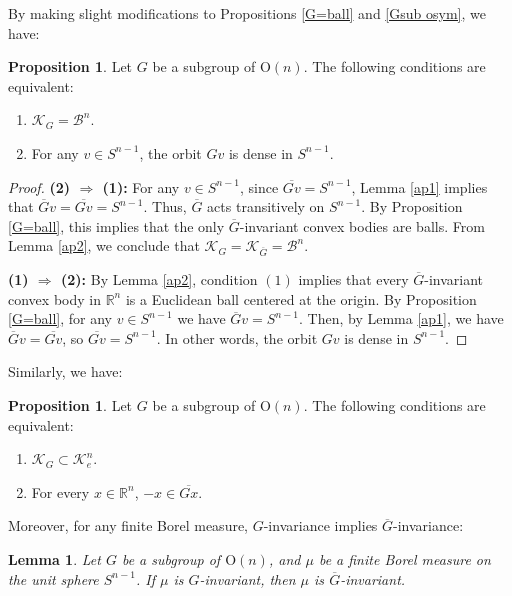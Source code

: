 \documentclass[12pt, reqno]{amsart}
\newtheorem{lemma}[theorem]{Lemma}
\theoremstyle{definition}
\newtheorem{proposition}[theorem]{Proposition}
\theoremstyle{remark}
\numberwithin{equation}{section}
\newcommand{\Rn}{\mathbb{R}^{n}}
\newcommand{\Sn}{S^{n-1}}
\newcommand{\On}{\mathrm{O}(n)}
\newcommand{\clG}{\overline{G}}
\newcommand{\KG}{\mathcal{K}_{G}}
\begin{document}
	
	By making slight modifications to Propositions \ref{G=ball} and \ref{Gsub osym}, we have:
	
		\begin{proposition}\label{open G ball}
		Let \( G \) be a  subgroup of  \( \On \). The following conditions are equivalent:
		\begin{enumerate}
			\item $\KG=\mathcal{B}^{n}$.
			\item For any $v \in \Sn$, the orbit $Gv$ is dense in $\Sn$.
		\end{enumerate}
	\end{proposition}
	
	\begin{proof}
		\medskip\noindent
		\textbf{(2) \(\Rightarrow\) (1):} 
 For any $v\in\Sn$, since $\overline{Gv}=\Sn$,  Lemma \ref{ap1} implies that  $\overline{G}v=\overline{Gv}=\Sn$. Thus, $\overline{G}$  acts transitively on $\Sn$. By Proposition \ref{G=ball}, this implies that the only $\overline{G}$-invariant convex bodies are balls.   From Lemma \ref{ap2}, we conclude that $\KG = \mathcal{K}_{\overline{G}} = \mathcal{B}^{n}$.
		
		\medskip\noindent
		\textbf{(1) \(\Rightarrow\) (2):}  
	By Lemma \ref{ap2}, condition $(1)$  implies that every $\overline{G}$-invariant 
	convex body in \( \mathbb{R}^n \) is a Euclidean ball centered at the origin.  By Proposition \ref{G=ball},  for any $v\in\Sn$ we have $\overline{G}v=\Sn$. Then, by Lemma \ref{ap1}, we have $\overline{G}v = \overline{Gv}$, so $\overline{Gv}=\Sn$. In other words, the orbit $Gv$ is dense in $\Sn$.
		\end{proof}
		
		Similarly, we have:
		
			\begin{proposition} 
			Let \(G\) be a  subgroup of \(\On\). The following conditions are equivalent:
			\begin{enumerate}
				\item $\KG \subset \mathcal{K}^{n}_{e}$.
				\item For every  \(x \in \Rn \),  \(-x \in \overline{Gx}\).
			\end{enumerate}
		\end{proposition}
		
		Moreover, for any finite Borel measure, $G$-invariance implies $\overline{G}$-invariance:

			
			\begin{lemma}\label{mu bar}
				Let $G$ be a subgroup of  $\On$, and $\mu$ be a finite Borel measure on the unit sphere $\Sn$. If $\mu$ is $G$-invariant, then $\mu$ is $\clG$-invariant.
			\end{lemma}
			
\end{document}

